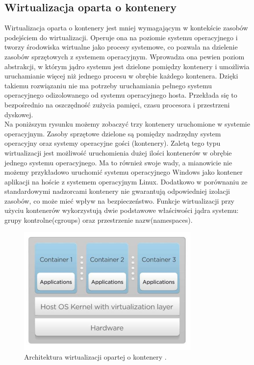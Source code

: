 \documentclass[12pt]{report}
\let\Oldsubsection\subsection
\renewcommand{\subsection}{\FloatBarrier\Oldsubsection}
\begin{document}
\subsection{Wirtualizacja oparta o kontenery}
Wirtualizacja oparta o kontenery jest mniej wymagającym w kontekście zasobów podejściem do wirtualizacji. Operuje ona na poziomie systemu operacyjnego i tworzy środowiska wirtualne jako procesy systemowe, co pozwala na dzielenie zasobów sprzętowych z systemem operacyjnym. Wprowadza ona pewien poziom abstrakcji, w którym jądro systemu jest dzielone pomiędzy kontenery i umożliwia uruchamianie więcej niż jednego procesu w obrębie każdego kontenera. Dzięki takiemu rozwiązaniu nie ma potrzeby uruchamiania pełnego systemu operacyjnego odizolowanego od systemu operacyjnego hosta. Przekłada się to bezpośrednio na oszczędność zużycia pamięci, czasu procesora i przestrzeni dyskowej. \\
\indent Na poniższym rysunku możemy zobaczyć trzy kontenery uruchomione w systemie operacyjnym. Zasoby sprzętowe dzielone są pomiędzy nadrzędny system operacyjny oraz systemy operacyjne gości (kontenery). Zaletą tego typu wirtualizacji jest możliwość uruchomienia dużej ilości kontenerów w obrębie jednego systemu operacyjnego. Ma to również swoje wady, a mianowicie nie możemy przykładowo uruchomić systemu operacyjnego Windows jako kontener aplikacji na hoście z systemem operacyjnym Linux. Dodatkowo w porównaniu ze standardowymi nadzorcami kontenery nie gwarantują odpowiedniej izolacji zasobów, co może mieć wpływ na bezpieczeństwo. Funkcje wirtualizacji przy użyciu kontenerów wykorzystują dwie podstawowe właściwości jądra systemu: grupy kontrolne(cgroups) oraz przestrzenie nazw(namespaces).

\begin{figure}[h]
	\centering
	\includegraphics[width=0.8\textwidth]{images/containerArch.jpg}
	\caption{Architektura wirtualizacji opartej o kontenery \cite{hypervisorArchImg}.}
\end{figure}
\end{document}
